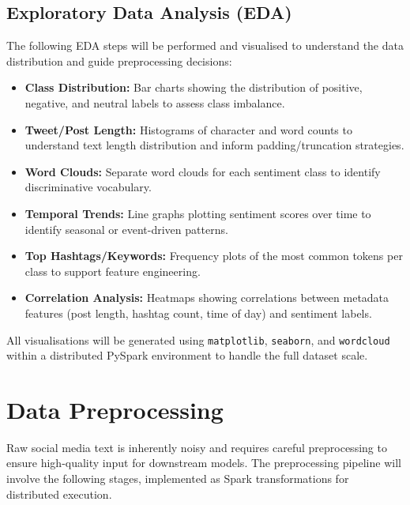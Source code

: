 \documentclass[conference]{IEEEtran}
\begin{document}
\subsection{Exploratory Data Analysis (EDA)}
The following EDA steps will be performed and visualised to understand the data distribution and guide preprocessing decisions:
\begin{itemize}[leftmargin=*]
    \item \textbf{Class Distribution:} Bar charts showing the distribution of positive, negative, and neutral labels to assess class imbalance.
    \item \textbf{Tweet/Post Length:} Histograms of character and word counts to understand text length distribution and inform padding/truncation strategies.
    \item \textbf{Word Clouds:} Separate word clouds for each sentiment class to identify discriminative vocabulary.
    \item \textbf{Temporal Trends:} Line graphs plotting sentiment scores over time to identify seasonal or event-driven patterns.
    \item \textbf{Top Hashtags/Keywords:} Frequency plots of the most common tokens per class to support feature engineering.
    \item \textbf{Correlation Analysis:} Heatmaps showing correlations between metadata features (post length, hashtag count, time of day) and sentiment labels.
\end{itemize}

All visualisations will be generated using \texttt{matplotlib}, \texttt{seaborn}, and \texttt{wordcloud} within a distributed PySpark environment to handle the full dataset scale.

\section{Data Preprocessing}

Raw social media text is inherently noisy and requires careful preprocessing to ensure high-quality input for downstream models. The preprocessing pipeline will involve the following stages, implemented as Spark transformations for distributed execution.
\end{document}
